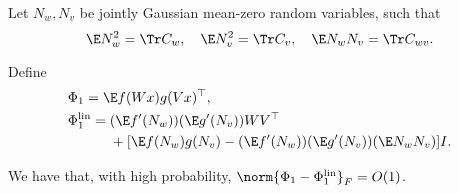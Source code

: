 Let \(N_w, N_v\) be jointly Gaussian mean-zero random variables, such that 
\begin{equation}
    \E N_w^2 = \Tr C_w,\quad \E N_v^2 = \Tr C_v,\quad \E N_w N_v = \Tr C_{wv}.
\end{equation}

Define 
\begin{equation}
    \begin{aligned}
        &\Phi_1 = \E f(Wx) g(Vx)^{\top}, \\
        &\Phi_1^{\mathrm{lin}} = (\E f'(N_w))(\E g'(N_v)) W V^\top \\
        &\qquad \quad + [\E f(N_w)g(N_v)-(\E f'(N_w))(\E g'(N_v))(\E N_w N_v)] I.
    \end{aligned}
\end{equation}
\begin{proposition}
\label{prop:lin_1_layer}
    We have that, with high probability, \(
        \norm{\Phi_1 - \Phi_1^{\mathrm{lin}}}_F = O(1)\).
\end{proposition}

